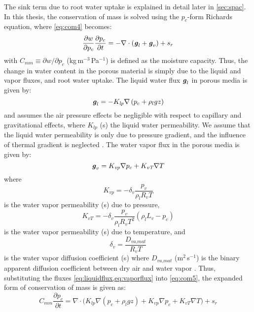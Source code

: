 The sink term due to root water uptake is explained in detail later in \cref{sec:spac}. In this thesis, the conservation of mass is solved using the $p_c$-form Richards equation, where \cref{eq:com4} becomes:
\begin{equation}
\frac{\partial w}{\partial p_c} \frac{\partial p_c}{\partial t} = -  \nabla \cdot \left(\textbf{\textit{g}}_l + \textbf{\textit{g}}_v\right) + s_{r}
\label{eq:com5}
\end{equation}
with $C_{mm} \equiv \partial w/ \partial p_c$ (kg\,m$^{-3}$\,Pa$^{-1}$) is defined as the moisture capacity. Thus, the change in water content in the porous material is simply due to the liquid and vapor fluxes, and root water uptake. The liquid water flux $\textbf{\textit{g}}_l$ in porous media is given by:
\begin{equation}
\textbf{\textit{g}}_l = - K_{\textit{lp}} \nabla \left(p_c + \rho_l g z\right)
\label{eq:liquidflux}
\end{equation}
and assumes the air pressure effects be negligible with respect to capillary and gravitational effects, where $K_{\textit{lp}}$ (s) the liquid water permeability. We assume that the liquid water permeability is only due to pressure gradient, and the influence of thermal gradient is neglected \citep{Carmeliet2005}. The water vapor flux in the porous media is given by:
\begin{equation}
\textbf{\textit{g}}_v = K_{\textit{vp}}\nabla p_c + K_{\textit{vT}}\nabla T
\label{eq:vaporflux}
\end{equation}
where
\begin{equation}
K_{\textit{vp}} = - \delta_v \frac{p_v}{\rho_l R_v T}
\end{equation}
is the water vapor permeability (s) due to pressure,  
\begin{equation}
K_{\textit{vT}} = - \delta_v \frac{p_v}{\rho_l R_v T^2}\left(\rho_l L_v - p_c\right)
\end{equation}
is the water vapor permeability (s) due to temperature, and
\begin{equation}
\delta_v = \frac{D_{\textit{va,mat}}}{R_v T}
\end{equation}
is the water vapor diffusion coefficient (s) where $D_{\textit{va,mat}}$ (m$^2$\,s$^{-1}$) is the binary apparent diffusion coefficient between dry air and water vapor \citep{Carmeliet2005, Defraeye2011, Saneinejad2013, Kubilay2014b}. Thus, substituting the fluxes \cref{eq:liquidflux,eq:vaporflux} into \cref{eq:com5}, the expanded form of conservation of mass is given as:
\begin{equation}
C_{\textit{mm}}\frac{\partial p_c}{\partial t} = \nabla \cdot \Big( K_{lp} \nabla \left(p_c + \rho_l g z\right) + K_{\textit{vp}}\nabla p_c + K_{\textit{vT}}\nabla T \Big) + s_r
\label{eq:com6}
\end{equation}

